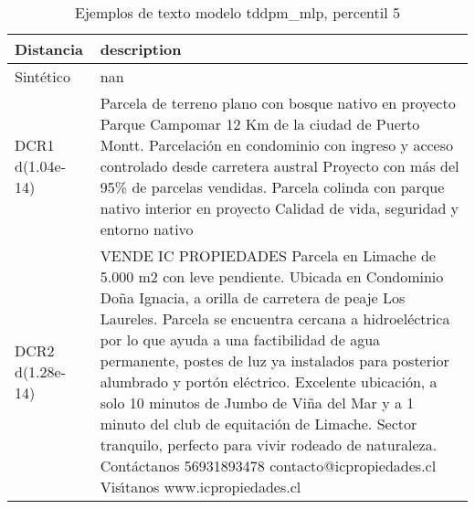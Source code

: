 \begin{table}[H]
\centering
\fontsize{10}{14}\selectfont
\caption{Ejemplos de texto modelo tddpm\_mlp, percentil 5}
\label{table-example-economicos-b-3-tddpm_mlp-5p-text}
\begin{tabular}{|l|m{35em}|}
\hline
\rowcolor[gray]{0.8}
Distancia & description \\
\hline Sintético & nan \\
\hline DCR1 d(1.04e-14) & Parcela de terreno plano con bosque nativo en proyecto Parque Campomar 12 Km de la ciudad de Puerto Montt.  Parcelaci\'on en condominio con ingreso y acceso controlado desde carretera austral Proyecto con m\'as del 95\% de parcelas vendidas.  Parcela colinda con parque nativo interior en proyecto Calidad de vida, seguridad y entorno nativo \\
\hline DCR2 d(1.28e-14) & VENDE IC PROPIEDADES  Parcela en Limache de 5.000 m2 con leve pendiente. Ubicada en Condominio Do\~na Ignacia, a orilla de carretera de peaje Los Laureles. Parcela se encuentra cercana a hidroel\'ectrica por lo que ayuda a una factibilidad de agua permanente, postes de luz ya instalados para posterior alumbrado y port\'on el\'ectrico.  Excelente ubicaci\'on, a solo 10 minutos de Jumbo de Vi\~na del Mar y a 1 minuto del club de equitaci\'on de Limache. Sector tranquilo, perfecto para vivir rodeado de naturaleza.  Cont\'actanos 56931893478 contacto@icpropiedades.cl  Vis{\'\i}tanos www.icpropiedades.cl \\
\hline
\end{tabular}
\end{table}
